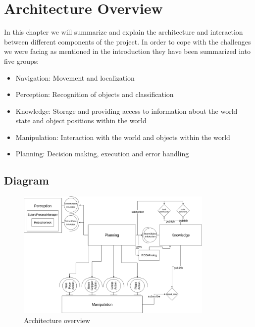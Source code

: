 \documentclass[main.tex]{subfiles}
\begin{document}
	\begingroup

	\renewcommand{\cleardoublepage}{}

	\renewcommand{\clearpage}{}

	\chapter{Architecture Overview}
		In this chapter we will summarize and explain the architecture and interaction between different components of the project.
		In order to cope with the challenges we were facing as mentioned in the introduction they have been summarized into five groups:

		\begin{itemize}
			\item Navigation: Movement and localization
			\item Perception: Recognition of objects and classification
			\item Knowledge: Storage and providing access to information about the world state and object positions within the world
			\item Manipulation: Interaction with the world and objects within the world
			\item Planning: Decision making, execution and error handling
		\end{itemize}
		


		\chapterauthor{}
		
		\section{Diagram}
		
		\begin{figure}[h]
			\centering
			\includegraphics[width=0.85\textwidth]{pictures/diagramms/architecture.png}
			\caption{Architecture overview}
			\label{architecture}
		\end{figure}
		
\end{document}
